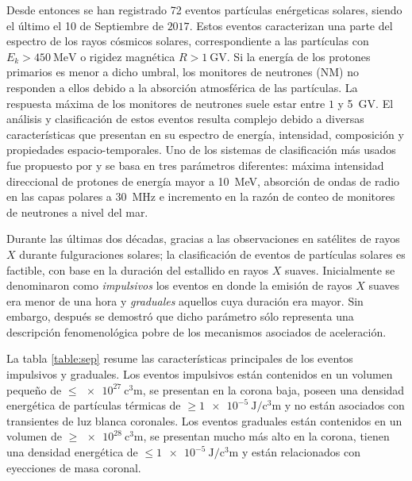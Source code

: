 Desde entonces se han registrado \num{72} eventos partículas enérgeticas solares, siendo el último el \num{10} de Septiembre de $2017$. Estos eventos caracterizan una parte del espectro de los rayos cósmicos solares, correspondiente a las partículas con $E_{k}>\SI{450}{\mega\electronvolt}$ o rigidez magnética $R> \SI{1}{\giga\volt}$. Si la energía de los protones primarios es menor a dicho umbral, los monitores de neutrones (NM) no responden a ellos debido a la absorción atmosférica de las partículas. La respuesta máxima de los monitores de neutrones suele estar entre $1$ y \SI{5}{\giga\volt}. El análisis y clasificación de estos eventos resulta complejo debido a diversas características que presentan en su espectro de energía, intensidad, composición y propiedades espacio-temporales. Uno de los sistemas de clasificación más usados fue propuesto por \cite{shea71} y se basa en tres parámetros diferentes: máxima intensidad direccional de protones de energía mayor a \SI{10}{\mega\electronvolt}, absorción de ondas de radio en las capas polares a \SI{30}{\mega\hertz} e incremento en la razón de conteo de monitores de neutrones a nivel del mar.

Durante las últimas dos décadas, gracias a las observaciones en satélites de rayos $X$ durante fulguraciones solares;  la clasificación de eventos de partículas solares es factible, con base en la duración del estallido en rayos $X$ suaves. Inicialmente se denominaron como \emph{impulsivos} los eventos en donde la emisión de rayos $X$ suaves era menor de una hora y \emph{graduales} aquellos cuya duración era mayor. Sin embargo, después se demostró que dicho parámetro sólo representa una descripción fenomenológica pobre de los mecanismos asociados de aceleración.

La tabla \ref{table:sep} resume las características principales de los eventos impulsivos y graduales. Los eventos impulsivos están contenidos en un volumen pequeño de $\leq\SI{e27}{\cubic\centi\metre}$, se presentan en la corona baja, poseen una densidad energética de partículas térmicas de $\geq\SI{1e-5}{\joule\per\cubic\centi\metre}$ y no están asociados con transientes de luz blanca coronales. Los eventos graduales están contenidos en un volumen de $\geq\SI{e28}{\cubic\centi\metre}$, se presentan mucho más alto en la corona, tienen una densidad energética de $\leq\SI{1e-5}{\joule\per\cubic\centi\metre}$ y están relacionados con eyecciones de masa coronal.

